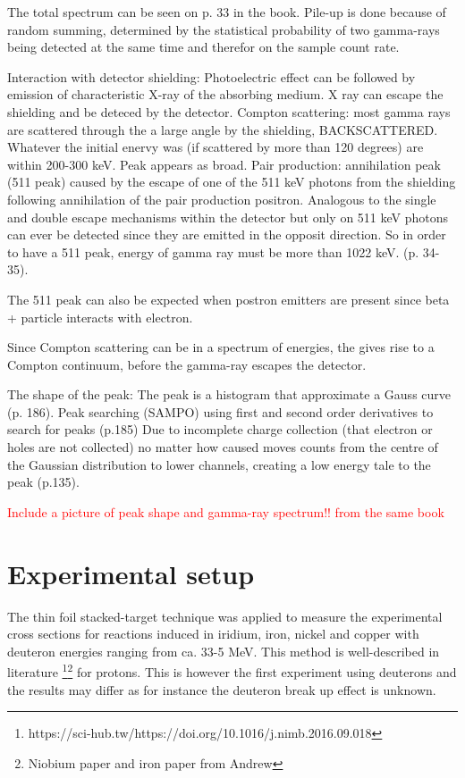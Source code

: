 \documentclass[a4paper,11pt,twoside]{book}
\begin{document}
The total spectrum can be seen on p. 33 in the book. Pile-up is done because of random summing, determined by the statistical probability of two gamma-rays being detected at the same time and therefor on the sample count rate. 

Interaction with detector shielding: Photoelectric effect can be followed by emission of characteristic X-ray of the absorbing medium. X ray can escape the shielding and be deteced by the detector. Compton scattering: most gamma rays are scattered through the a large angle by the shielding, BACKSCATTERED. Whatever the initial enervy  was (if scattered by more than 120 degrees) are within 200-300 keV. Peak appears as broad. Pair production: annihilation peak (511 peak) caused by the escape of one of the 511 keV photons from the shielding following annihilation of the pair production positron. Analogous to the single and double escape mechanisms within the detector but only on 511 keV photons can ever be detected since they are emitted in the opposit direction. So in order to have a 511 peak, energy of gamma ray must be more than 1022 keV. (p. 34-35).

The 511 peak can also be expected when postron emitters are present since beta + particle interacts with electron.  

Since Compton scattering can be in a spectrum of energies, the gives rise to a Compton continuum, before the gamma-ray escapes the detector. 


The shape of the peak: The peak is a histogram that approximate a Gauss curve (p. 186). Peak searching (SAMPO) using first and second order derivatives to search for peaks (p.185)
Due to incomplete charge collection (that electron or holes are not collected) no matter how caused moves counts from the centre of the Gaussian distribution to lower channels, creating a low energy tale to the peak (p.135).  

\textcolor{red}{Include a picture of peak shape and gamma-ray spectrum!! from the same book}

\chapter{Experimental setup}

The thin foil stacked-target technique was applied to measure the experimental cross sections for reactions induced in iridium, iron, nickel and copper with deuteron energies ranging from ca. 33-5 MeV. This method is well-described in literature \footnote{https://sci-hub.tw/https://doi.org/10.1016/j.nimb.2016.09.018}\footnote{Niobium paper and iron paper from Andrew} for protons. This is however the first experiment using deuterons and the results may differ as for instance the deuteron break up effect is unknown. 
\end{document}
